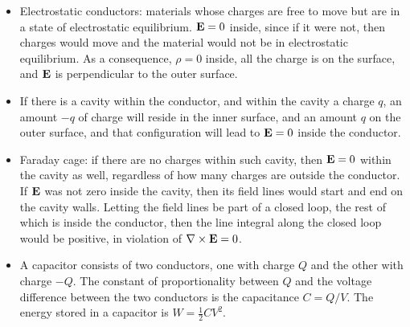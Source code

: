 \documentclass[a4paper,11pt]{report}
\begin{document}
\begin{itemize}
\item Electrostatic conductors: materials whose charges are free to move but are in a state of electrostatic equilibrium. $\mathbf{E} = 0$ inside, since if it were not, then charges would move and the material would not be in electrostatic equilibrium. As a consequence, $\rho = 0$ inside, all the charge is on the surface, and $\mathbf{E}$ is perpendicular to the outer surface.

\item If there is a cavity within the conductor, and within the cavity a charge $q$, an amount $-q$ of charge will reside in the inner surface, and an amount $q$ on the outer surface, and that configuration will lead to $\mathbf{E} = 0$ inside the conductor.

\item Faraday cage: if there are no charges within such cavity, then $\mathbf{E} = 0$ within the cavity as well, regardless of how many charges are outside the conductor. If $\mathbf{E}$ was not zero inside the cavity, then its field lines would start and end on the cavity walls. Letting the field lines be part of a closed loop, the rest of which is inside the conductor, then the line integral along the closed loop would be positive, in violation of $\nabla \times \mathbf{E} = 0$.

\item A capacitor consists of two conductors, one with charge $Q$ and the other with charge $-Q$. The constant of proportionality between $Q$ and the voltage difference between the two conductors is the capacitance $C = Q/V$. The energy stored in a capacitor is $W = \frac{1}{2} CV^2$.

\end{itemize}

\end{document}
